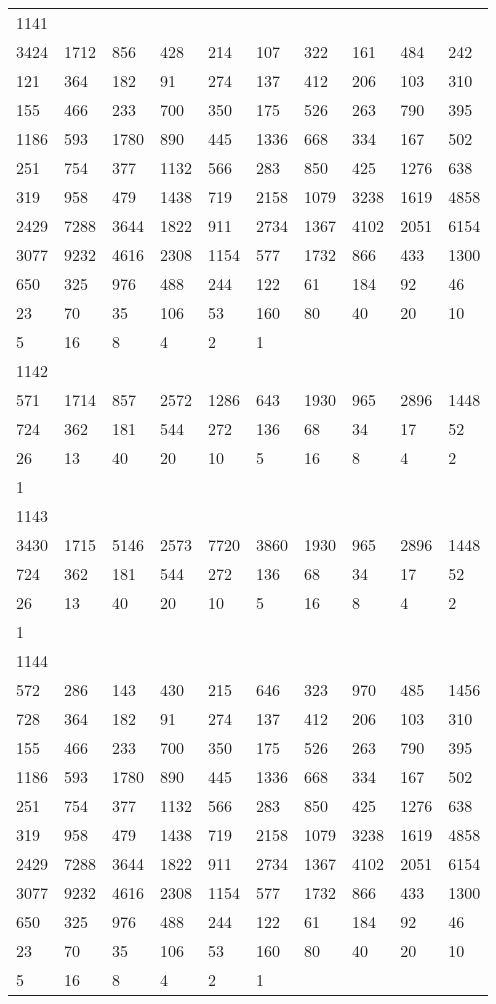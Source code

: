 \begin{longtable}{*{10}{l}}
1141&&&&&&&&&\\
3424& 1712& 856& 428& 214& 107& 322& 161& 484& 242\\
121& 364& 182& 91& 274& 137& 412& 206& 103& 310\\
155& 466& 233& 700& 350& 175& 526& 263& 790& 395\\
1186& 593& 1780& 890& 445& 1336& 668& 334& 167& 502\\
251& 754& 377& 1132& 566& 283& 850& 425& 1276& 638\\
319& 958& 479& 1438& 719& 2158& 1079& 3238& 1619& 4858\\
2429& 7288& 3644& 1822& 911& 2734& 1367& 4102& 2051& 6154\\
3077& 9232& 4616& 2308& 1154& 577& 1732& 866& 433& 1300\\
650& 325& 976& 488& 244& 122& 61& 184& 92& 46\\
23& 70& 35& 106& 53& 160& 80& 40& 20& 10\\
5& 16& 8& 4& 2& 1& \\

1142&&&&&&&&&\\
571& 1714& 857& 2572& 1286& 643& 1930& 965& 2896& 1448\\
724& 362& 181& 544& 272& 136& 68& 34& 17& 52\\
26& 13& 40& 20& 10& 5& 16& 8& 4& 2\\
1& \\

1143&&&&&&&&&\\
3430& 1715& 5146& 2573& 7720& 3860& 1930& 965& 2896& 1448\\
724& 362& 181& 544& 272& 136& 68& 34& 17& 52\\
26& 13& 40& 20& 10& 5& 16& 8& 4& 2\\
1& \\

1144&&&&&&&&&\\
572& 286& 143& 430& 215& 646& 323& 970& 485& 1456\\
728& 364& 182& 91& 274& 137& 412& 206& 103& 310\\
155& 466& 233& 700& 350& 175& 526& 263& 790& 395\\
1186& 593& 1780& 890& 445& 1336& 668& 334& 167& 502\\
251& 754& 377& 1132& 566& 283& 850& 425& 1276& 638\\
319& 958& 479& 1438& 719& 2158& 1079& 3238& 1619& 4858\\
2429& 7288& 3644& 1822& 911& 2734& 1367& 4102& 2051& 6154\\
3077& 9232& 4616& 2308& 1154& 577& 1732& 866& 433& 1300\\
650& 325& 976& 488& 244& 122& 61& 184& 92& 46\\
23& 70& 35& 106& 53& 160& 80& 40& 20& 10\\
5& 16& 8& 4& 2& 1& \\


\end{longtable}
